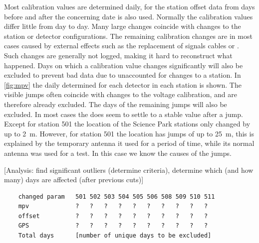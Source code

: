 Most calibration values are determined daily, for the station offset data from days before and after the concerning date is also used. Normally the calibration values differ little from day to day. Many large changes coincide with changes to the station or detector configurations. The remaining calibration changes are in most cases caused by external effects such as the replacement of signals cables or \pmts. Such changes are generally not logged, making it hard to reconstruct what happened. Days on which a calibration value changes significantly will also be excluded to prevent bad data due to unaccounted for changes to a station. In \cref{fig:mpv} the daily determined \mpv for each detector in each station is shown. The visible jumps often coincide with changes to the \pmt voltage calibration, and are therefore already excluded. The days of the remaining jumps will also be excluded. In most cases the \mpv does seem to settle to a stable value after a jump. Except for station 501 the \gps location of the Science Park stations only changed by up to \SI{2}{\meter}. However, for station 501 the \gps location has jumps of up to \SI{25}{\meter}, this is explained by the temporary \gps antenna it used for a period of time, while its normal \gps antenna was used for a test. In this case we know the causes of the jumps.

[Analysis: find significant outliers (determine criteria), determine which (and how many) days are affected (after previous cuts)]

\begin{verbatim}
    changed param   501 502 503 504 505 506 508 509 510 511
    mpv             ?   ?   ?   ?   ?   ?   ?   ?   ?   ?
    offset          ?   ?   ?   ?   ?   ?   ?   ?   ?   ?
    GPS             ?   ?   ?   ?   ?   ?   ?   ?   ?   ?
    Total days      [number of unique days to be excluded]
\end{verbatim}

